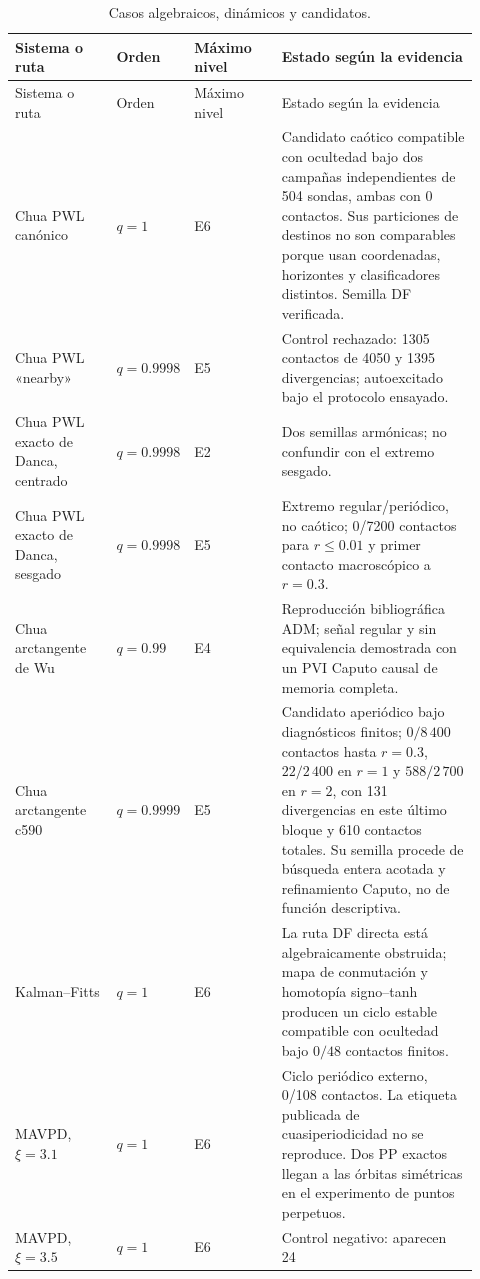 \begin{longtable}{@{}L{0.22\linewidth}C{0.08\linewidth}L{0.19\linewidth}L{0.43\linewidth}@{}}
\caption{Casos algebraicos, dinámicos y candidatos.}\label{tab:master-cases}\\
\toprule
Sistema o ruta & Orden & Máximo nivel & Estado según la evidencia\\
\midrule
\endfirsthead
\toprule
Sistema o ruta & Orden & Máximo nivel & Estado según la evidencia\\
\midrule
\endhead
Chua PWL canónico & \(q=1\) & E6 & Candidato caótico compatible con ocultedad
bajo dos campañas independientes de 504 sondas, ambas con 0 contactos. Sus
particiones de destinos no son comparables porque usan coordenadas, horizontes
y clasificadores distintos. Semilla DF verificada.\\
Chua PWL «nearby» & \(q=0.9998\) & E5 & Control rechazado: 1305
contactos de 4050 y 1395 divergencias; autoexcitado bajo el protocolo ensayado.\\
Chua PWL exacto de Danca, centrado & \(q=0.9998\) & E2 & Dos semillas
armónicas; no confundir con el extremo sesgado.\\
Chua PWL exacto de Danca, sesgado & \(q=0.9998\) & E5 & Extremo
regular/periódico, no caótico; 0/7200 contactos para \(r\leq 0.01\) y primer
contacto macroscópico a \(r=0.3\).\\
Chua arctangente de Wu & \(q=0.99\) & E4 & Reproducción bibliográfica ADM;
señal regular y sin equivalencia demostrada con un PVI Caputo causal de memoria
completa.\\
Chua arctangente c590 & \(q=0.9999\) & E5 & Candidato aperiódico bajo
diagnósticos finitos; \(0/8\,400\) contactos hasta \(r=0.3\),
\(22/2\,400\) en \(r=1\) y \(588/2\,700\) en \(r=2\), con 131
divergencias en este último bloque y 610 contactos totales. Su semilla procede
de búsqueda entera acotada y
refinamiento Caputo, no de función descriptiva.\\
Kalman--Fitts & \(q=1\) & E6 & La ruta DF directa está algebraicamente
obstruida; mapa de conmutación y homotopía signo--tanh producen un ciclo
estable compatible con ocultedad bajo \(0/48\) contactos finitos.\\
MAVPD, \(\xi=3.1\) & \(q=1\) & E6 & Ciclo periódico externo, 0/108
contactos. La etiqueta publicada de cuasiperiodicidad no se reproduce. Dos PP
exactos llegan a las órbitas simétricas en el experimento de puntos perpetuos.\\
MAVPD, \(\xi=3.5\) & \(q=1\) & E6 & Control negativo: aparecen 24

\end{longtable}
